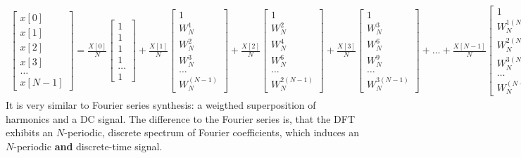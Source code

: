 \documentclass[11pt,a4paper,DIV=12]{scrartcl}
\begin{document}
\begin{align*}
\begin{bmatrix}
x[0]\\[1em]
x[1]\\[1em]
x[2]\\[1em]
x[3]\\[1em]
\dots\\[1em]
x[N-1]
\end{bmatrix}
=
\frac{X[0]}{N}
\begin{bmatrix}
1\\[1em]
1\\[1em]
1\\[1em]
1\\[1em]
\dots\\[1em]
1
\end{bmatrix}
+\frac{X[1]}{N}
\begin{bmatrix}
1\\[1em]
W_N^1\\[1em]
W_N^2\\[1em]
W_N^3\\[1em]
\dots\\[1em]
W_N^{(N-1)}
\end{bmatrix}
+\frac{X[2]}{N}
\begin{bmatrix}
1\\[1em]
W_N^2\\[1em]
W_N^4\\[1em]
W_N^6\\[1em]
\dots\\[1em]
W_N^{2(N-1)}
\end{bmatrix}
+\frac{X[3]}{N}
\begin{bmatrix}
1\\[1em]
W_N^3\\[1em]
W_N^6\\[1em]
W_N^9\\[1em]
\dots\\[1em]
W_N^{3(N-1)}
\end{bmatrix}
+
\dots
+\frac{X[N-1]}{N}
\begin{bmatrix}
1\\[1em]
W_N^{1(N-1)}\\[1em]
W_N^{2(N-1)}\\[1em]
W_N^{3(N-1)}\\[1em]
\dots\\[1em]
W_N^{(N-1)(N-1)}
\end{bmatrix}.
\end{align*}
%
It is very similar to Fourier series synthesis: a weigthed superposition of
harmonics and a DC signal.
%
The difference to the Fourier series is, that the DFT exhibits an
$N$-periodic, discrete spectrum of Fourier coefficients,
which induces an $N$-periodic \textbf{and} discrete-time signal.
%
\end{document}
